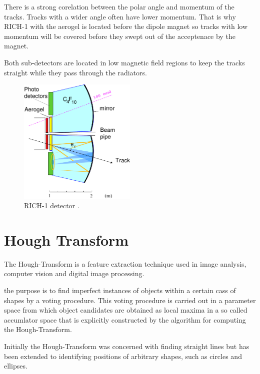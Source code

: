 \documentclass[10pt,twoside]{scrreprt}
\begin{document}
There is a strong corelation between the polar angle and momentum of the tracks. Tracks with a wider angle often have lower momentum. That is why RICH-1 with the aerogel is located before the dipole magnet so tracks with low momentum will be covered before they swept out of the acceptenace by the magnet.

Both sub-detectors are located in low magnetic field regions to keep the tracks straight while they pass through the radiators.

\begin{figure}[tb]
  \centering
  \includegraphics[width=0.5\textwidth]{pics/rich1_schematic}
  \caption{RICH-1 detector \cite{LHCb:2000}.}
  \label{fig:rich1}
\end{figure}



\section{Hough Transform} %
\label{sec:hough_transform}

The Hough-Transform is a feature extraction technique used in image analysis, computer vision and digital image processing.

the purpose is to find imperfect instances of objects within a certain cass of shapes by a voting procedure. This voting procedure is carried out in a parameter space from which object candidates are obtained as local maxima in a so called accumlator space that is explicitly constructed by the algorithm for computing the Hough-Transform.

Initially the Hough-Transform was concerned with finding straight lines but has been extended to identifying positions of arbitrary shapes, such as circles and ellipses.
\end{document}
